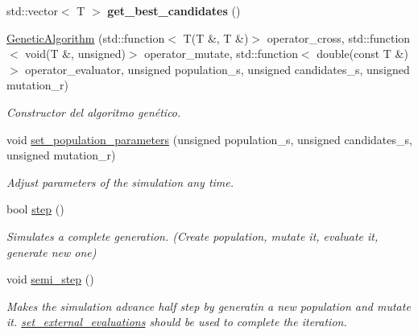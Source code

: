 \begin{DoxyCompactItemize}
\item 
\mbox{\label{class_genetic_algorithm_a6ca0bbf76e60cacdd77712971dded001}} 
std\+::vector$<$ T $>$ {\bfseries get\+\_\+best\+\_\+candidates} ()
\item 
\mbox{\hyperlink{class_genetic_algorithm_a9fda0f2f53ba15c4dc932d37eab9aff7}{Genetic\+Algorithm}} (std\+::function$<$ T(T \&, T \&)$>$ operator\+\_\+cross, std\+::function$<$ void(T \&, unsigned)$>$ operator\+\_\+mutate, std\+::function$<$ double(const T \&)$>$ operator\+\_\+evaluator, unsigned population\+\_\+s, unsigned candidates\+\_\+s, unsigned mutation\+\_\+r)
\begin{DoxyCompactList}\small\item\em Constructor del algoritmo genético. \end{DoxyCompactList}\item 
void \mbox{\hyperlink{class_genetic_algorithm_a9e3afa46dbfb501b42e1905023b47432}{set\+\_\+population\+\_\+parameters}} (unsigned population\+\_\+s, unsigned candidates\+\_\+s, unsigned mutation\+\_\+r)
\begin{DoxyCompactList}\small\item\em Adjust parameters of the simulation any time. \end{DoxyCompactList}\item 
bool \mbox{\hyperlink{class_genetic_algorithm_a5d4afa4cd644ae80b6001184f6b8728d}{step}} ()
\begin{DoxyCompactList}\small\item\em Simulates a complete generation. (Create population, mutate it, evaluate it, generate new one) \end{DoxyCompactList}\item 
\mbox{\label{class_genetic_algorithm_ab52124a783d776e8ba658bf665e0be66}} 
void \mbox{\hyperlink{class_genetic_algorithm_ab52124a783d776e8ba658bf665e0be66}{semi\+\_\+step}} ()
\begin{DoxyCompactList}\small\item\em Makes the simulation advance half step by generatin a new population and mutate it. \mbox{\hyperlink{class_genetic_algorithm_af1632165d5b43d91b290a8a257e0f0e7}{set\+\_\+external\+\_\+evaluations}} should be used to complete the iteration. \end{DoxyCompactList}\item 

\end{DoxyCompactItemize}
